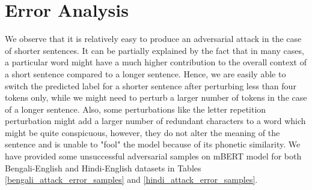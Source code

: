 \documentclass[sigconf]{acmart}
\begin{document}


\section{Error Analysis}
We observe that it is relatively easy to produce an adversarial attack in the case of shorter sentences. It can be partially explained by the fact that in many cases, a particular word might have a much higher contribution to the overall context of a short sentence compared to a longer sentence. Hence, we are easily able to switch the predicted label for a shorter sentence after perturbing less than four tokens only, while we might need to perturb a larger number of tokens in the case of a longer sentence.
Also, some perturbations like the letter repetition perturbation might add a larger number of redundant characters to a word which might be quite conspicuous, however, they do not alter the meaning of the sentence and is unable to "fool" the model because of its phonetic similarity. We have provided some unsuccessful adversarial samples on mBERT model for both Bengali-English and Hindi-English datasets in Tables \ref{bengali_attack_error_samples} and \ref{hindi_attack_error_samples}.
\end{document}
